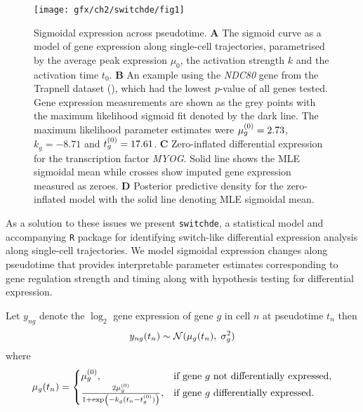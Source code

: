 \begin{figure}[!h]
\centering
\texttt{[image: gfx/ch2/switchde/fig1]}
\caption[Sigmoidal expression across pseudotime.]{Sigmoidal expression across pseudotime.
\textbf{A} The sigmoid curve as a model of gene expression along single-cell trajectories, parametrised by the average peak expression $\mu_0$, the activation strength $k$ and the activation time $t_0$.
\textbf{B} An example using the \emph{NDC80} gene from the Trapnell dataset (\cite{Trapnell2014-xi}), which had the lowest $p$-value of all genes tested. Gene expression measurements are shown as the grey points with the maximum likelihood sigmoid fit denoted by the dark line. The maximum likelihood parameter estimates were ${\mu^{(0)}_g} = 2.73$, $k_g = -8.71$ and ${t^{(0)}_g} = 17.61$.
\textbf{C} Zero-inflated differential expression for the transcription factor \emph{MYOG}. Solid line shows the MLE sigmoidal mean while  crosses show imputed gene expression measured as zeroes.
\textbf{D} Posterior predictive density for the zero-inflated model with the solid line denoting MLE sigmoidal mean.
}\label{fig:01}
\end{figure}


As a solution to these issues we present \texttt{switchde}, a statistical model and accompanying \texttt{R} package for identifying switch-like differential expression analysis along single-cell trajectories. We model sigmoidal expression changes along pseudotime that provides interpretable parameter estimates corresponding to gene regulation strength and timing along with hypothesis testing for differential expression.



Let $y_{ng}$ denote the $\log_2$ gene expression of gene $g$ in cell $n$ at pseudotime $t_n$ then
\begin{equation} \label{eq:nzi}
y_{ng}(t_n) \sim \mathcal{N}(\mu_g(t_n), \; \sigma_g^2)
\end{equation}
where
\begin{equation}
    \mu_g(t_n) =
\begin{cases}
    \hfil  \mu^{(0)}_g, & \text{if } \text{gene $g$ not differentially expressed},  \\
    \frac{2 \mu^{(0)}_g}{1 + \exp\left(-k_g(t_n - t^{(0)}_g)\right)}, &  \text{if gene $g$ differentially expressed}.
\end{cases}
\end{equation}

